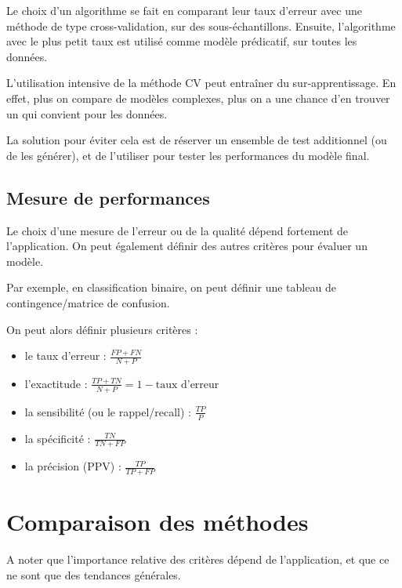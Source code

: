 Le choix d'un algorithme se fait en comparant leur taux d'erreur avec une méthode de type cross-validation, sur des sous-échantillons. Ensuite, l'algorithme avec le plus petit taux est utilisé comme modèle prédicatif, sur toutes les données.

L'utilisation intensive de la méthode CV peut entraîner du sur-apprentissage. En effet, plus on compare de modèles complexes, plus on a une chance d'en trouver un qui convient pour les données.

La solution pour éviter cela est de réserver un ensemble de test additionnel (ou de les générer), et de l'utiliser pour tester les performances du modèle final.

\subsection{Mesure de performances}

Le choix d'une mesure de l'erreur ou de la qualité dépend fortement de l'application. On peut également définir des autres critères pour évaluer un modèle.

Par exemple, en classification binaire, on peut définir une tableau de contingence/matrice de confusion.


On peut alors définir plusieurs critères :

\begin{itemize}
	\item le taux d'erreur : $\frac{FP + FN}{N + P}$
	\item l'exactitude : $\frac{TP + TN}{N + P} = 1 - \text{taux d'erreur}$
	\item la sensibilité (ou le rappel/recall) : $\frac{TP}{P}$
	\item la spécificité : $\frac{TN}{TN + FP}$
	\item la précision (PPV) : $\frac{TP}{TP + FP}$
\end{itemize}


\section{Comparaison des méthodes}
	

	A noter que l'importance relative des critères dépend de l'application, et que ce ne sont que des tendances générales.
